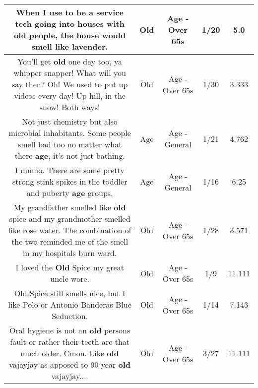 \documentclass[11pt]{article}
\newlength\mylength
\begin{document}
\begin{center}
\begin{longtable}{|C{.65\mylength}|C{.30\mylength}|C{.12\mylength}|C{.12\mylength}|C{.12\mylength}|}
  \small When I use to be a service tech going into houses with \textbf{old} people, the house would smell like lavender.\normalsize   & Old & Age - Over 65s & 1/20 & 5.0 \\  \hline
  \small You'll get \textbf{old} one day too, ya whipper snapper! What will you say then? Oh! We used to put up videos every day! Up hill, in the snow! Both ways!\normalsize   & Old & Age - Over 65s & 1/30 & 3.333 \\  \hline
  \small Not just chemistry but also microbial inhabitants. Some people smell bad too no matter what there \textbf{age}, it's not just bathing.\normalsize   & Age & Age - General & 1/21 & 4.762 \\  \hline
  \small I dunno.  There are some pretty strong stink spikes in the toddler and puberty \textbf{age} groups.\normalsize   & Age & Age - General & 1/16 & 6.25 \\  \hline
  \small My grandfather smelled like \textbf{old} spice and my grandmother smelled like rose water. The combination of the two reminded me of the smell in my hospitals burn ward.\normalsize   & Old & Age - Over 65s & 1/28 & 3.571 \\  \hline
  \small I loved the \textbf{Old} Spice my great uncle wore.\normalsize   & Old & Age - Over 65s & 1/9 & 11.111 \\  \hline
  \small Old Spice still smells nice,  but I like Polo or Antonio Banderas Blue Seduction.\normalsize   & Old & Age - Over 65s & 1/14 & 7.143 \\  \hline
  \small Oral hygiene is not an \textbf{old} persons fault or rather their teeth are that much older. Cmon. Like \textbf{old} vajayjay as apposed to 90 year \textbf{old} vajayjay....\normalsize   & Old & Age - Over 65s & 3/27 & 11.111 \\  \hline

\end{longtable}
\end{center}
\end{document}

